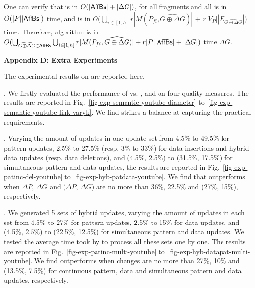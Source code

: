 \vspace{-1.5ex}
One can verify that \identifyaffball is in $O(|{\mathsf{AffBs}}| + |\Delta G|)$,
\incmatch for all fragments and all \affballsx is in $O(|P||{\mathsf{AffBs}}|)$ time, and \comb is in $O(\bigcup_{i\in[1,h]}r|M(P_{fi}, \widehat{G\oplus\Delta G})|$ + $r|V_{P}||E_{\widehat{G\oplus\Delta G}}|)$ time.
Therefore, algorithm \incd is in
$O(\bigcup_{\widehat{G\oplus\Delta G}\in {\ensuremath {\mathsf{AffBs}}}} \bigcup_{i\in[1,h]}r|M(P_{fi}, \widehat{G\oplus\Delta G})|+r|P||{\mathsf{AffBs}}| + |\Delta G|)$ time \wrt $\Delta G$.

\vspace{1ex}
\noindent
{\large \textbf{Appendix D: Extra Experiments}}
\label{sec-apd-exp}

\vspace{-0.5ex}
The experimental results on \youtube are reported here.

\vspace{-1.8ex}
. We firstly evaluated the performance of \optgrouprec vs. \mindia, \minsumdis and \denalk on \youtube \wrt four quality measures.
The results are reported in Fig.~\ref{fig-exp-semantic-youtube-diameter} to~\ref{fig-exp-semantic-youtube-link-varyk}.
We find \optgrouprec strikes a balance at capturing the practical requirements.

\vspace{-1.8ex}
. Varying the amount of updates in one update set from 4.5\% to 49.5\% for pattern updates, 2.5\% to 27.5\% (resp. 3\% to 33\%) for data insertions and hybrid data updates (resp. data deletions), and (4.5\%, 2.5\%) to (31.5\%, 17.5\%) for simultaneous pattern and data updates, the results are reported in Fig.~\ref{fig-exp-patinc-del-youtube} to~\ref{fig-exp-hyb-patdata-youtube}.
We find that \inc outperforms \optgrouprec when $\Delta P$, $\Delta G$ and $(\Delta P$, $\Delta G)$ are no more than 36\%, 22.5\% and (27\%, 15\%), respectively.

\vspace{-1.8ex}
. We generated 5 sets of hybrid updates,
varying the amount of updates in each set from 4.5\% to 27\% for pattern updates, 2.5\% to 15\% for data updates,
and (4.5\%, 2.5\%) to (22.5\%, 12.5\%) for simultaneous pattern and data updates.
We tested the average time took by \inc to process all these sets one by one.
The results are reported in Fig.~\ref{fig-exp-patinc-multi-youtube} to~\ref{fig-exp-hyb-datapat-multi-youtube}.
We find \inc outperforms \optgrouprec when changes are no more than 27\%, 10\% and (13.5\%, 7.5\%) for continuous pattern, data and simultaneous pattern and data updates, respectively.

